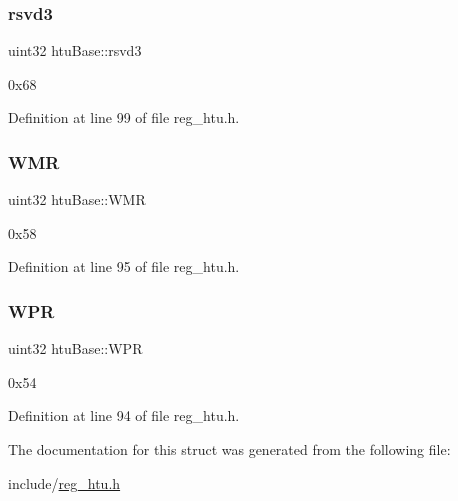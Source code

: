 \subsubsection{\texorpdfstring{rsvd3}{rsvd3}}
{\footnotesize\ttfamily uint32 htu\+Base\+::rsvd3}

0x68 

Definition at line 99 of file reg\+\_\+htu.\+h.

\mbox{\label{structhtuBase_a4dce3c11df89934c6ca546b3f643315b}} 
\subsubsection{\texorpdfstring{W\+MR}{WMR}}
{\footnotesize\ttfamily uint32 htu\+Base\+::\+W\+MR}

0x58 

Definition at line 95 of file reg\+\_\+htu.\+h.

\mbox{\label{structhtuBase_ae4a9e4a7b755cf8eb1b0c957a331c6e6}} 
\subsubsection{\texorpdfstring{W\+PR}{WPR}}
{\footnotesize\ttfamily uint32 htu\+Base\+::\+W\+PR}

0x54 

Definition at line 94 of file reg\+\_\+htu.\+h.



The documentation for this struct was generated from the following file\+:\begin{DoxyCompactItemize}
\item 
include/\mbox{\hyperlink{reg__htu_8h}{reg\+\_\+htu.\+h}}\end{DoxyCompactItemize}
